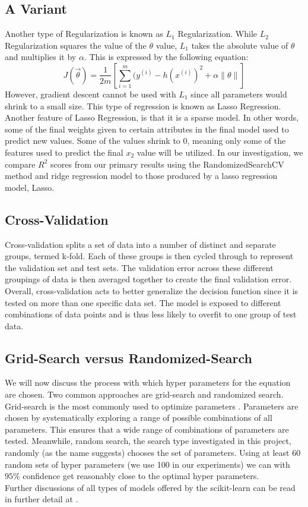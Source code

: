 \subsection{A Variant}
Another type of Regularization is known as $L_{1}$ Regularization. While $L_{2}$
Regularization squares the value of the $\theta$ value, $L_{1}$ takes the absolute 
value of $\theta$ and multiplies it by $\alpha$. This is expressed by the following equation:
$$J(\vec{\theta}) = \frac{1}{2m} [\sum_{i = 1}^{m} (y^{(i)} - h(x^{(i)})^2 + \alpha \| \theta \|]$$
However, gradient descent cannot be 
used with $L_{1}$ since all parameters would shrink to a small size. This type of 
regression is known as Lasso Regression. Another feature of Lasso Regression, is that it is a sparse model. In other words, some of the final weights given to certain attributes in the final model used to predict new values. Some of the values shrink to 0, meaning only some of the features used to predict the final $x_{2}$ value will be utilized.
In our investigation, we compare $R^{2}$
scores from our primary results using the RandomizedSearchCV method and 
ridge regression model to those produced by a lasso regression model, Lasso.
 \cite{scikit}

\subsection{Cross-Validation}

Cross-validation splits a set of data into a number of distinct and separate groups, termed k-fold. 
Each of these groups is then cycled through to represent the validation set and test sets. 
The validation error across these different groupings of data is then averaged together
to create the final validation error. Overall, cross-validation acts to better generalize the decision
function since it is tested on more than one specific data set. The model is exposed to different 
combinations of data points and is thus less likely to overfit to one group of test data. 


\subsection{Grid-Search versus Randomized-Search}
We will now discuss the process
with which hyper parameters for the equation are chosen. Two common approaches
are grid-search and randomized search. Grid-search is the most commonly used to
optimize parameters \cite{scikit}. Parameters are chosen by systematically exploring
a range of possible combinations of all parameters. This ensures that a wide
range of combinations of parameters are tested. Meanwhile, random search,
the search type investigated in this project, randomly (as the name suggests)
chooses the  set of parameters. Using at least 60 random sets of hyper parameters 
(we use 100 in our experiments) we can with $95\%$ confidence get reasonably close to the optimal
hyper parameters.\\

 Further discussions of all types of models offered by the scikit-learn can
 be read in further detail at \cite{scikit}.
